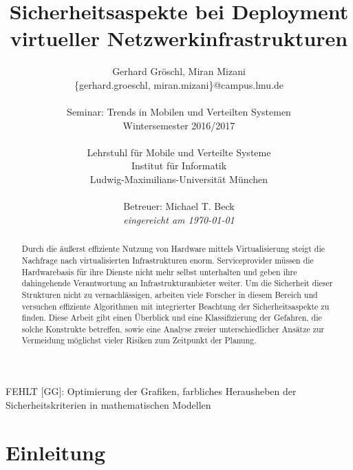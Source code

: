 \documentclass{lni}
\author{Gerhard Gröschl, Miran Mizani\\\{gerhard.groeschl, miran.mizani\}@campus.lmu.de\\\\
Seminar: Trends in Mobilen und Verteilten Systemen \\Wintersemester 2016/2017\\\\
Lehrstuhl für Mobile und Verteilte Systeme\\Institut für Informatik\\Ludwig-Maximilians-Universität München\\\\
Betreuer: Michael T. Beck\\\textit{eingereicht am \today}}
\title{Sicherheitsaspekte bei Deployment virtueller Netzwerkinfrastrukturen}
\begin{document}
\maketitle

\vfill
FEHLT [GG]: Optimierung der Grafiken, farbliches Herausheben der Sicherheitskriterien in mathematischen Modellen

\begin{abstract}
Durch die äußerst effiziente Nutzung von Hardware mittels Virtualisierung steigt die Nachfrage nach virtualisierten Infrastrukturen enorm. Serviceprovider müssen die Hardwarebasis für ihre Dienste nicht mehr selbst unterhalten und geben ihre dahingehende Verantwortung an Infrastrukturanbieter weiter. Um die Sicherheit dieser Strukturen nicht zu vernachlässigen, arbeiten viele Forscher in diesem Bereich und versuchen effiziente Algorithmen mit integrierter Beachtung der Sicherheitsaspekte zu finden. Diese Arbeit gibt einen Überblick und eine Klassifizierung der Gefahren, die solche Konstrukte betreffen, sowie eine Analyse zweier unterschiedlicher Ansätze zur Vermeidung möglichst vieler Risiken zum Zeitpunkt der Planung.
\end{abstract}


\newpage
\tableofcontents
\newpage

\section{Einleitung}
\label{sec:Einleitung}





\end{document}

